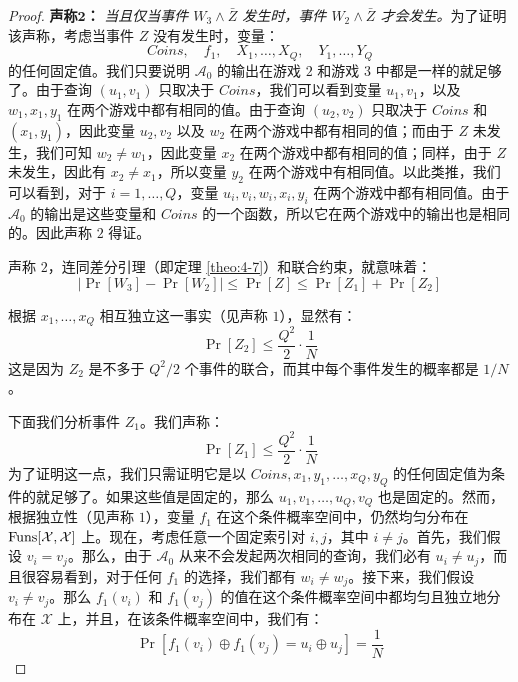 \begin{proof}
\vspace{5pt}

\noindent
\textbf{声称$\mathbf{2}$：}
\emph{当且仅当事件 $W_3\land\bar Z$ 发生时，事件 $W_2\land\bar Z$ 才会发生。}为了证明该声称，考虑当事件 $Z$ 没有发生时，变量：
\[
\mathit{Coins},\quad
f_1,\quad
X_1,\dots,X_Q,\quad
Y_1,\dots,Y_Q
\]
的任何固定值。我们只要说明 $\mathcal{A}_0$ 的输出在游戏 $2$ 和游戏 $3$ 中都是一样的就足够了。由于查询 $(u_1,v_1)$ 只取决于 $\mathit{Coins}$，我们可以看到变量 $u_1,v_1$，以及 $w_1,x_1,y_1$ 在两个游戏中都有相同的值。由于查询 $(u_2,v_2)$ 只取决于 $\mathit{Coins}$ 和 $(x_1,y_1)$，因此变量 $u_2,v_2$ 以及 $w_2$ 在两个游戏中都有相同的值；而由于 $Z$ 未发生，我们可知 $w_2\neq w_1$，因此变量 $x_2$ 在两个游戏中都有相同的值；同样，由于 $Z$ 未发生，因此有 $x_2\neq x_1$，所以变量 $y_2$ 在两个游戏中有相同值。以此类推，我们可以看到，对于 $i=1,\dots,Q$，变量 $u_i,v_i,w_i,x_i,y_i$ 在两个游戏中都有相同值。由于 $\mathcal{A}_0$ 的输出是这些变量和 $\mathit{Coins}$ 的一个函数，所以它在两个游戏中的输出也是相同的。因此声称 $2$ 得证。

声称 $2$，连同差分引理（即定理 \ref{theo:4-7}）和联合约束，就意味着：
\begin{equation}\label{eq:4-27}
\big\lvert
\Pr[W_3]-\Pr[W_2]
\big\rvert
\leq
\Pr[Z]
\leq
\Pr[Z_1]+\Pr[Z_2]
\end{equation}

根据 $x_1,\dots,x_Q$ 相互独立这一事实（见声称 $1$），显然有：
\begin{equation}\label{eq:4-28}
\Pr[Z_2]
\leq
\frac{Q^2}{2}
\cdot
\frac{1}{N}
\end{equation}
这是因为 $Z_2$ 是不多于 ${Q^2}/{2}$ 个事件的联合，而其中每个事件发生的概率都是 $1/N$。

下面我们分析事件 $Z_1$。我们声称：
\begin{equation}\label{eq:4-29}
\Pr[Z_1]
\leq
\frac{Q^2}{2}
\cdot
\frac{1}{N}
\end{equation}
为了证明这一点，我们只需证明它是以 $\mathit{Coins},x_1,y_1,\dots,x_Q,y_Q$ 的任何固定值为条件的就足够了。如果这些值是固定的，那么 $u_1,v_1,\dots,u_Q,v_Q$ 也是固定的。然而，根据独立性（见声称 $1$），变量 $f_1$ 在这个条件概率空间中，仍然均匀分布在 ${\rm Funs}[\mathcal{X},\mathcal{X}]$ 上。现在，考虑任意一个固定索引对 $i,j$，其中 $i\neq j$。首先，我们假设 $v_i=v_j$。那么，由于 $\mathcal{A}_0$ 从来不会发起两次相同的查询，我们必有 $u_i\neq u_j$，而且很容易看到，对于任何 $f_1$ 的选择，我们都有 $w_i\neq w_j$。接下来，我们假设 $v_i\neq v_j$。那么 $f_1(v_i)$ 和 $f_1(v_j)$ 的值在这个条件概率空间中都均匀且独立地分布在 $\mathcal{X}$ 上，并且，在该条件概率空间中，我们有：
\[
\Pr[f_1(v_i)\oplus f_1(v_j)=u_i\oplus u_j]=\frac{1}{N}
\]


\end{proof}
